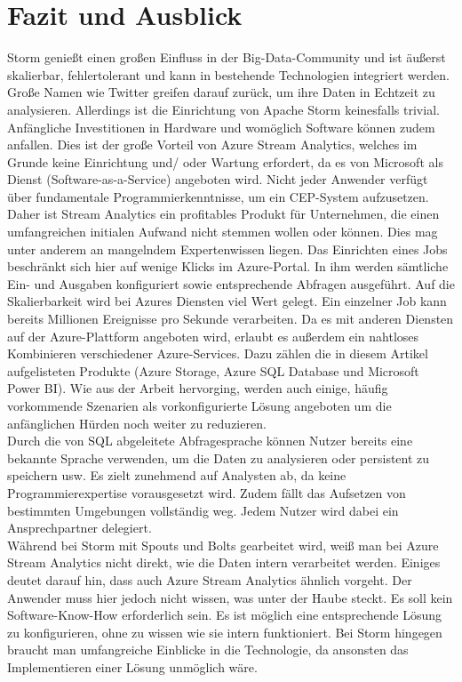 \section{Fazit und Ausblick}
Storm genießt einen großen Einfluss in der Big-Data-Community und ist äußerst skalierbar, fehlertolerant und kann in bestehende Technologien integriert werden. Große Namen wie Twitter greifen darauf zurück, um ihre Daten in Echtzeit zu analysieren. Allerdings ist die Einrichtung von Apache Storm keinesfalls trivial. Anfängliche Investitionen in Hardware und womöglich Software können zudem anfallen. Dies ist der große Vorteil von Azure Stream Analytics, welches im Grunde keine Einrichtung und/ oder Wartung erfordert, da es von Microsoft als Dienst (Software-as-a-Service) angeboten wird. Nicht jeder Anwender verfügt über fundamentale Programmierkenntnisse, um ein CEP-System aufzusetzen. Daher ist Stream Analytics ein profitables Produkt für Unternehmen, die einen umfangreichen initialen Aufwand nicht stemmen wollen oder können. Dies mag unter anderem an mangelndem Expertenwissen liegen. Das Einrichten eines Jobs beschränkt sich hier auf wenige Klicks im Azure-Portal. In ihm werden sämtliche Ein- und Ausgaben konfiguriert sowie entsprechende Abfragen ausgeführt. Auf die Skalierbarkeit wird bei Azures Diensten viel Wert gelegt. Ein einzelner Job kann bereits Millionen Ereignisse pro Sekunde verarbeiten. Da es mit anderen Diensten auf der Azure-Plattform angeboten wird, erlaubt es außerdem ein nahtloses Kombinieren verschiedener Azure-Services. Dazu zählen die in diesem Artikel aufgelisteten Produkte (Azure Storage, Azure SQL Database und Microsoft Power BI). Wie aus der Arbeit hervorging, werden auch einige, häufig vorkommende Szenarien als vorkonfigurierte Lösung angeboten um die anfänglichen Hürden noch weiter zu reduzieren.\\
Durch die von SQL abgeleitete Abfragesprache können Nutzer bereits eine bekannte Sprache verwenden, um die Daten zu analysieren oder persistent zu speichern usw. Es zielt zunehmend auf Analysten ab, da keine Programmierexpertise vorausgesetzt wird. Zudem fällt das Aufsetzen von bestimmten Umgebungen vollständig weg. Jedem Nutzer wird dabei ein Ansprechpartner delegiert.\\ 
Während bei Storm mit Spouts und Bolts gearbeitet wird, weiß man bei Azure Stream Analytics nicht direkt, wie die Daten intern verarbeitet werden. Einiges deutet darauf hin, dass auch Azure Stream Analytics ähnlich vorgeht. Der Anwender muss hier jedoch nicht wissen, was unter der Haube steckt. Es soll kein Software-Know-How erforderlich sein. Es ist möglich eine entsprechende Lösung zu konfigurieren, ohne zu wissen wie sie intern funktioniert. Bei Storm hingegen braucht man umfangreiche Einblicke in die Technologie, da ansonsten das Implementieren einer Lösung unmöglich wäre.\\ 
